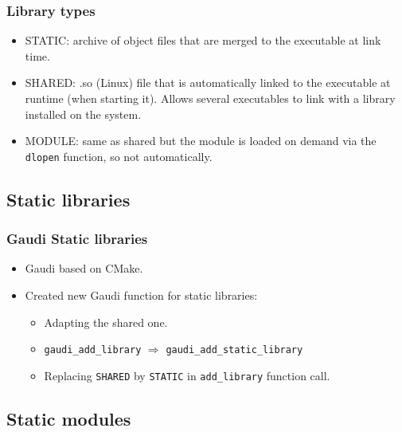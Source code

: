 \documentclass{beamer}
\begin{document}
    \begin{frame}[fragile]
        \frametitle{Library types}

        \begin{itemize}
            \item STATIC: archive of object files that are merged to the executable at link time.
            \item SHARED: .so (Linux) file that is automatically linked to the executable at runtime (when starting it).
            Allows several executables to link with a library installed on the system.
            \item MODULE: same as shared but the module is loaded on demand via the \verb'dlopen' function, so not automatically.
        \end{itemize}
    \end{frame}

    \subsection{Static libraries}

    \begin{frame}[fragile]
        \frametitle{Gaudi Static libraries}

        \begin{itemize}
            \item Gaudi based on CMake.
            \item Created new Gaudi function for static libraries:
            \begin{itemize}
                \item Adapting the shared one.
                \item \verb'gaudi_add_library' $\Rightarrow$ \verb'gaudi_add_static_library'
                \item Replacing \verb'SHARED' by \verb'STATIC' in \verb'add_library' function call.
            \end{itemize}
        \end{itemize}
    \end{frame}

    \subsection{Static modules}
\end{document}
